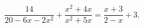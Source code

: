 \begin{ex}[type=equation]
	\begin{condition}
		$\dfrac{14}{20 -6x - 2x^2} + \dfrac{x^2 + 4x}{x^2 + 5x} = \dfrac{x + 3}{2 - x} + 3.$
	\end{condition}
\end{ex}